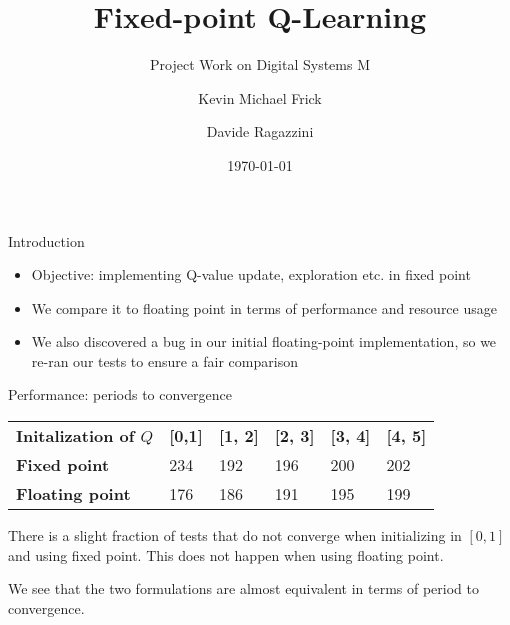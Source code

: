 \documentclass[10pt,xcolor={table,dvipsnames},t]{beamer}
\title[AP-SD-M]{Fixed-point Q-Learning}
\subtitle{Project Work on Digital Systems M}
\author{Kevin Michael Frick \and Davide Ragazzini}
\institute{University of Bologna}
\date{\today}
\begin{document}
\begin{frame}
  \titlepage
\end{frame}

\begin{frame}{Introduction}

\begin{itemize}
  \item Objective: implementing Q-value update, exploration etc. in fixed point
  \item We compare it to floating point in terms of performance and resource usage
  \item We also discovered a bug in our initial floating-point implementation, so we re-ran our tests to ensure a fair comparison
\end{itemize}

\end{frame}


\begin{frame}{Performance: periods to convergence}
\begin{table}[]
\begin{tabular}{llllll}
\textbf{Initalization of $Q$}  & \textbf{{[}0,1{]}} & \textbf{{[}1, 2{]}} & \textbf{{[}2, 3{]}} & \textbf{{[}3, 4{]}} & \textbf{{[}4, 5{]}} \\
\textbf{Fixed point}    & 234                & 192                 & 196                 & 200                 & 202                 \\
\textbf{Floating point} & 176                & 186                 & 191                 & 195                 & 199                
\end{tabular}
\end{table}

There is a slight fraction of tests that do not converge when initializing in $[0, 1]$ and using fixed point. This does not happen when using floating point.

We see that the two formulations are almost equivalent in terms of period to convergence.

\end{frame}
\end{document}
